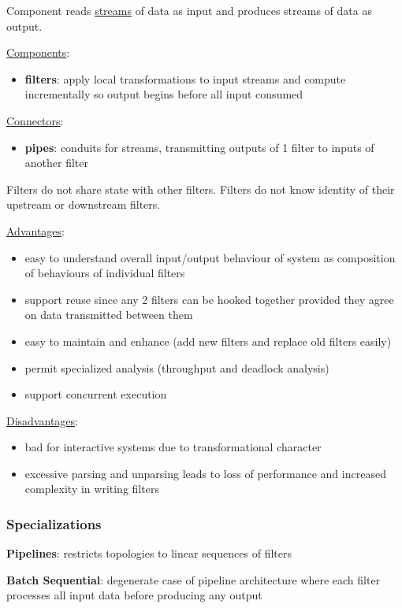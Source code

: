 \documentclass[11pt]{article}
\begin{document}
Component reads \uline{streams} of data as input and produces streams of data as output.

\uline{Components}:
\begin{itemize}
\item \textbf{filters}: apply local transformations to input streams and compute incrementally so output begins
before all input consumed
\end{itemize}

\uline{Connectors}:
\begin{itemize}
\item \textbf{pipes}: conduits for streams, transmitting outputs of 1 filter to inputs of another filter
\end{itemize}

Filters do not share state with other filters.
Filters do not know identity of their upstream or downstream filters.

\uline{Advantages}:
\begin{itemize}
\item easy to understand overall input/output behaviour of system as composition of behaviours of
individual filters
\item support reuse since any 2 filters can be hooked together provided they agree on data transmitted
between them
\item easy to maintain and enhance (add new filters and replace old filters easily)
\item permit specialized analysis (throughput and deadlock analysis)
\item support concurrent execution
\end{itemize}

\uline{Disadvantages}:
\begin{itemize}
\item bad for interactive systems due to transformational character
\item excessive parsing and unparsing leads to loss of performance and increased complexity in
writing filters
\end{itemize}
\subsubsection{Specializations}
\label{sec:org6bf1201}
\textbf{Pipelines}: restricts topologies to linear sequences of filters

\textbf{Batch Sequential}: degenerate case of pipeline architecture where each filter processes all
input data before producing any output
\end{document}
